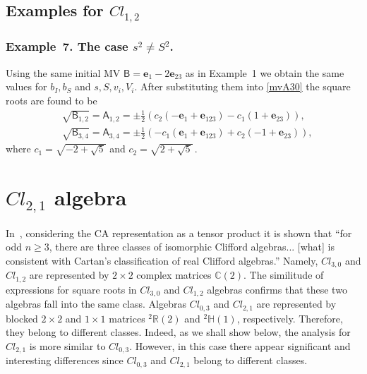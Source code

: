 \documentclass{birkjour}
\newcommand{\e}[1]{\mathbf{e}_{#1}} %
\newcommand{\cl}[2]{\ensuremath{\mathit{Cl}_{#1,#2}}}
\newcommand{\bbR}{\ensuremath{\mathbb{R}}}
\newcommand{\bbC}{\ensuremath{\mathbb{C}}}
\newcommand{\bbH}{\ensuremath{\mathbb{H}}}
\def\A{\mathsf{A}}
\def\B{\mathsf{B}}
\def\e#1{\mathbf{e}_{#1}} %
\begin{document}
\subsection{Examples for $\cl{1}{2}$}
\subsubsection*{Example~7. The case $s^2\neq S^2$.}
Using the same initial MV  $\B=\e{1}-2 \e{23}$ as in
Example~1 we obtain the same values for $b_I,
b_S$ and $s, S, v_i, V_i$. After substituting them into
\eqref{mvA30} the square roots are found to be
\begin{equation}
\begin{split}
  &\sqrt{\B_{1,2}}=\A_{1,2}=\pm\frac12 (c_2 (-\e{1}+\e{1 2 3})-c_1 (1+\e{2 3})),\\
  &\sqrt{\B_{3,4}}=\A_{3,4}=\pm \frac12 (-c_1 (\e{1}+\e{1 2 3})+c_2 (-1+\e{2 3})),
\end{split}\end{equation}
where $c_1=\sqrt{-2+\sqrt{5}}$ and  $c_2=\sqrt{2+\sqrt{5}}$\,.


\section{\cl{2}{1} algebra}\label{sec:Cl21} In~\cite{Marchuk2015}, considering the
CA representation as a tensor product it is shown that ``for odd
$n \ge 3$, there are three classes of isomorphic Clifford
algebras... [what] is consistent with Cartan's classification of
real Clifford algebras.'' Namely, \cl{3}{0} and \cl{1}{2}  are
represented by $2\times 2$ complex matrices $\bbC(2)$. The
similitude of expressions  for square roots in \cl{3}{0} and
\cl{1}{2} algebras confirms that these two algebras fall into the
same class. Algebras \cl{0}{3} and \cl{2}{1} are represented by
blocked $2\times 2$ and $1\times 1$ matrices ${^2}\bbR(2)$ and
${^2}\bbH(1)$, respectively.  Therefore, they belong to different
classes. Indeed, as we shall show below, the analysis for
\cl{2}{1} is more similar to \cl{0}{3}. However, in this case
there appear significant and interesting differences since
\cl{0}{3} and \cl{2}{1} belong to different classes.
\end{document}
